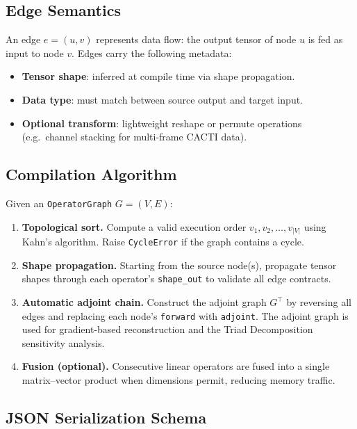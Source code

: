 \documentclass[11pt]{article}
\theoremstyle{definition}
\begin{document}
\subsection{Edge Semantics}

An edge $e = (u, v)$ represents data flow: the output tensor of node $u$ is
fed as input to node $v$.  Edges carry the following metadata:
\begin{itemize}
  \item \textbf{Tensor shape}: inferred at compile time via shape propagation.
  \item \textbf{Data type}: must match between source output and target input.
  \item \textbf{Optional transform}: lightweight reshape or permute operations
        (e.g.\ channel stacking for multi-frame CACTI data).
\end{itemize}

\subsection{Compilation Algorithm}

Given an \texttt{OperatorGraph} $G = (V, E)$:

\begin{enumerate}
  \item \textbf{Topological sort.}  Compute a valid execution order
        $v_1, v_2, \ldots, v_{|V|}$ using Kahn's algorithm.
        Raise \texttt{CycleError} if the graph contains a cycle.
  \item \textbf{Shape propagation.}  Starting from the source node(s), propagate
        tensor shapes through each operator's \texttt{shape\_out} to validate
        all edge contracts.
  \item \textbf{Automatic adjoint chain.}  Construct the adjoint graph
        $G^\top$ by reversing all edges and replacing each node's
        \texttt{forward} with \texttt{adjoint}.  The adjoint graph is used for
        gradient-based reconstruction and the Triad Decomposition sensitivity analysis.
  \item \textbf{Fusion (optional).}  Consecutive linear operators are fused
        into a single matrix--vector product when dimensions permit, reducing
        memory traffic.
\end{enumerate}

\subsection{JSON Serialization Schema}
\end{document}
